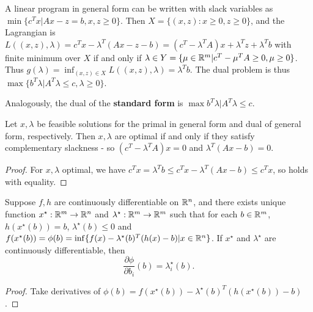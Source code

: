 \begin{thm}
  \label{sec:linear-programming-4}
  A linear program in general form can be written with slack variables
  as $\min \{ c^{T} x | Ax - z = b, x, z \geq 0 \} $. Then $X = \{ (x,
  z) : x \geq 0, z \geq 0 \} $, and the Lagrangian is $L((x, z),
  \lambda) = c^{T} x - \lambda^{T}(Ax - z - b) = (c^{T} - \lambda^{T}
  A)x + \lambda^{T} z + \lambda^{T}b$ with finite minimum over $X$ if
  and only if $\lambda \in Y = \{ \mu \in \mathbb{R}^{m} | c^{T}- \mu^{T} A
  \geq 0, \mu \geq 0 \} $. Thus $g(\lambda) = \inf_{(x, z) \in X}
  L((x, z), \lambda) = \lambda^{T} b$. The dual problem is thus $\max
  \{ b^{T} \lambda | A^{T} \lambda \leq c, \lambda \geq 0 \}$.

  Analogously, the dual of the \textbf{standard form} is $\max b^{T}
  \lambda | A^{T} \lambda \leq c$.
\end{thm}

\begin{thm}
  \label{sec:linear-programming-5}
  Let $x, \lambda$ be feasible solutions for the primal in general
  form and dual of general form, respectively.  Then $x, \lambda$ are
  optimal if and only if they satisfy complementary slackness - so
  $(c^{T} - \lambda^{T} A) x = 0$ and $\lambda^{T}(Ax - b) = 0$.
\end{thm}

\begin{proof}
  For $x, \lambda$ optimal, we have $c^{T} x = \lambda^{T} b \leq
  c^{T}x - \lambda^{T}(Ax - b) \leq c^{T} x$, so holds with equality.
\end{proof}

\begin{thm}
  \label{sec:linear-programming-6}
  Suppose $f, h$ are continuously differentiable on $\mathbb{R}^{n}$, and
  there exists unique function $x^{\star}: \mathbb{R}^{m} \rightarrow \mathbb{R}^{n}$
  and $\lambda^{\star}: \mathbb{R}^{m} \rightarrow \mathbb{R}^{m}$ such that for each
  $b \in \mathbb{R}^{m}$, $h(x^{\star}(b)) = b$, $\lambda^{\star}(b) \leq 0$
  and $f(x^{\star}(b)) = \phi(b) = \inf \{ f(x) -
  \lambda^{\star}(b)^{T}(h(x) - b) | x \in \mathbb{R}^{n}\} $.  If $x^{\star}$
  and $\lambda^{\star}$ are continuously differentiable, then
  \begin{equation}
    \label{eq:3}
    \frac{\partial \phi}{\partial b_{i}} (b) = \lambda^{\star}_{i}(b).
  \end{equation}
\end{thm}

\begin{proof}
  Take derivatives of $\phi(b) = f(x^{\star}(b)) -
  \lambda^{\star}(b)^{T}(h(x^{\star}(b)) - b)$.
\end{proof}

